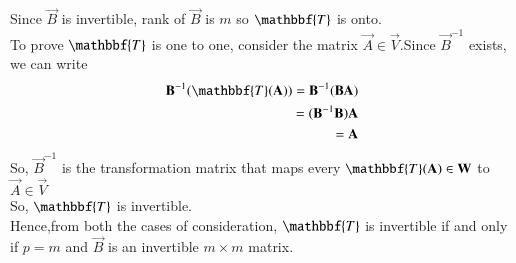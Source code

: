 \documentclass[journal,12pt,twocolumn]{IEEEtran}
\begin{document}
Since $\vec{B}$ is invertible, rank of $\vec{B}$ is $m$ so $\mathbbf{T}$ is onto.\\
To prove $\mathbbf{T}$ is one to one, consider the matrix $\vec{A} \in \vec{V}$.Since $\vec{B}^{-1}$ exists, we can write
\begin{align}
    \vec{B}^{-1}(\mathbbf{T}(\vec{A}))= \vec{B}^{-1}(\vec{B}\vec{A})\\=(\vec{B}^{-1}\vec{B})\vec{A}\\=\vec{A}
\end{align}
So, $\vec{B}^{-1}$ is the transformation matrix that maps every $\mathbbf{T}(\vec{A}) \in \vec{W}$ to $\vec{A} \in \vec{V}$\\
So, $\mathbbf{T}$ is invertible.\\
Hence,from both the cases of consideration, $\mathbbf{T}$ is invertible if and only if $p=m$ and $\vec{B}$ is an invertible $m \times m$ matrix.
\end{document}
